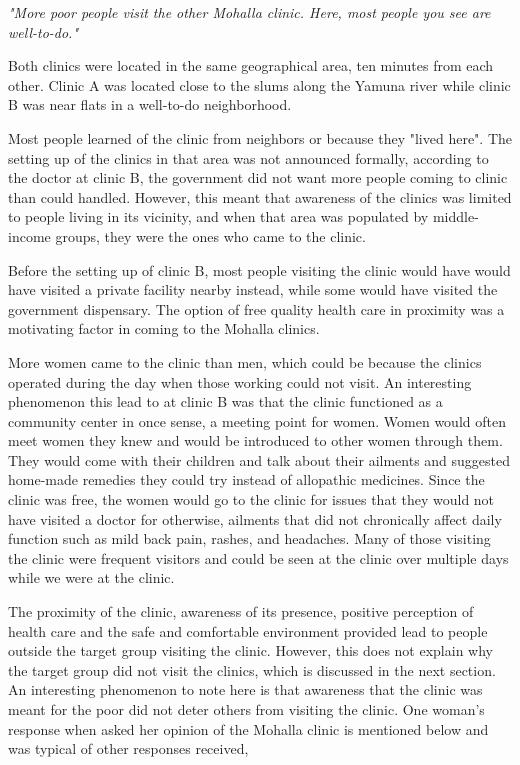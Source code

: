 \textit{"More poor people visit the other Mohalla clinic. Here, most people you see are well-to-do."} 

Both clinics were located in the same geographical area, ten minutes from each other. Clinic A was located close to the slums along the Yamuna river while clinic B was near flats in a well-to-do neighborhood. %

Most people learned of the clinic from neighbors or because they "lived here". The setting up of the clinics in that area was not announced formally, according to the doctor at clinic B, the government did not want more people coming to clinic than could handled. However, this meant that awareness of the clinics was limited to people living in its vicinity, and when that area was populated by middle-income groups, they were the ones who came to the clinic.

Before the setting up of clinic B, most people visiting the clinic would have would have visited a private facility nearby instead, while some would have visited the government dispensary. The option of free quality health care in proximity was a motivating factor in coming to the Mohalla clinics. 

More women came to the clinic than men, which could be because the clinics operated during the day when those working could not visit. An interesting phenomenon this lead to at clinic B was that the clinic functioned as a community center in once sense, a meeting point for women. Women would often meet women they knew and would be introduced to other women through them. They would come with their children and talk about their ailments and suggested home-made remedies they could try instead of allopathic medicines. Since the clinic was free, the women would go to the clinic for issues that they would not have visited a doctor for otherwise, ailments that did not chronically affect daily function such as mild back pain, rashes, and headaches. Many of those visiting the clinic were frequent visitors and could be seen at the clinic over multiple days while we were at the clinic. 

The proximity of the clinic, awareness of its presence, positive perception of health care and the safe and comfortable environment provided lead to people outside the target group visiting the clinic. However, this does not explain why the target group did not visit the clinics, which is discussed in the next section. An interesting phenomenon to note here is that awareness that the clinic was meant for the poor did not deter others from visiting the clinic. One woman's response when asked her opinion of the Mohalla clinic is mentioned below and was typical of other responses received, 

